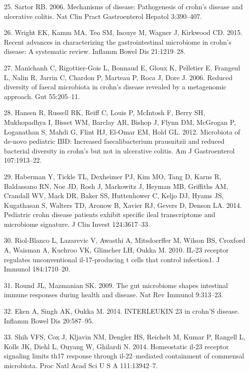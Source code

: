 \documentclass[12pt,]{article}
\begin{document}
\hypertarget{ref-sartor_IBDpath_2006}{}
25. Sartor RB. 2006. Mechanisms of disease: Pathogenesis of crohn's
disease and ulcerative colitis. Nat Clin Pract Gastroenterol Hepatol
3:390--407.

\hypertarget{ref-wright_CDmicrobiome_2015}{}
26. Wright EK, Kamm MA, Teo SM, Inouye M, Wagner J, Kirkwood CD. 2015.
Recent advances in characterizing the gastrointestinal microbiome in
crohn's disease: A systematic review. Inflamm Bowel Dis 21:1219--28.

\hypertarget{ref-manichanh_diversityCD_2006}{}
27. Manichanh C, Rigottier-Gois L, Bonnaud E, Gloux K, Pelletier E,
Frangeul L, Nalin R, Jarrin C, Chardon P, Marteau P, Roca J, Dore J.
2006. Reduced diversity of faecal microbiota in crohn's disease revealed
by a metagenomic approach. Gut 55:205--11.

\hypertarget{ref-hansen_pedsIBD_2012}{}
28. Hansen R, Russell RK, Reiff C, Louis P, McIntosh F, Berry SH,
Mukhopadhya I, Bisset WM, Barclay AR, Bishop J, Flynn DM, McGrogan P,
Loganathan S, Mahdi G, Flint HJ, El-Omar EM, Hold GL. 2012. Microbiota
of de-novo pediatric IBD: Increased faecalibacterium prausnitzii and
reduced bacterial diversity in crohn's but not in ulcerative colitis. Am
J Gastroenterol 107:1913--22.

\hypertarget{ref-haberman_pedsCD_2014}{}
29. Haberman Y, Tickle TL, Dexheimer PJ, Kim MO, Tang D, Karns R,
Baldassano RN, Noe JD, Rosh J, Markowitz J, Heyman MB, Griffiths AM,
Crandall WV, Mack DR, Baker SS, Huttenhower C, Keljo DJ, Hyams JS,
Kugathasan S, Walters TD, Aronow B, Xavier RJ, Gevers D, Denson LA.
2014. Pediatric crohn disease patients exhibit specific ileal
transcriptome and microbiome signature. J Clin Invest 124:3617--33.

\hypertarget{ref-Riol-Blanco_IL23microbiome_2010}{}
30. Riol-Blanco L, Lazarevic V, Awasthi A, Mitsdoerffer M, Wilson BS,
Croxford A, Waisman A, Kuchroo VK, Glimcher LH, Oukka M. 2010. IL-23
receptor regulates unconventional il-17-producing t cells that control
infection1. J Immunol 184:1710--20.

\hypertarget{ref-Round_IL23microbiome_2009}{}
31. Round JL, Mazmanian SK. 2009. The gut microbiome shapes intestinal
immune responses during health and disease. Nat Rev Immunol 9:313--23.

\hypertarget{ref-Eken_IL23CD_2014}{}
32. Eken A, Singh AK, Oukka M. 2014. INTERLEUKIN 23 in crohn'S disease.
Inflamm Bowel Dis 20:587--95.

\hypertarget{ref-Shih_IL23Th17_2014}{}
33. Shih VFS, Cox J, Kljavin NM, Dengler HS, Reichelt M, Kumar P,
Rangell L, Kolls JK, Diehl L, Ouyang W, Ghilardi N. 2014. Homeostatic
il-23 receptor signaling limits th17 response through il-22--mediated
containment of commensal microbiota. Proc Natl Acad Sci U S A
111:13942--7.
\end{document}

